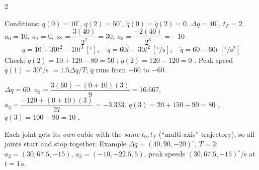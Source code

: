 \begin{multicols}{2}
\nopagebreak[4]
\begin{worked}
Conditions: $q(0)=10^\circ$, $q(2)=50^\circ$, $\dot q(0)=\dot q(2)=0$. $\Delta q=40^\circ$, $t_F=2$.\\
$a_0=10,\ a_1=0,\ a_2=\dfrac{3(40)}{2^2}=30,\ a_3=\dfrac{-2(40)}{2^3}=-10$.
\[q=10+30t^2-10t^3\ [^\circ],\quad \dot q=60t-30t^2\ [^\circ/\text{s}],\quad \ddot q=60-60t\ [^\circ/\text{s}^2]\]
Check: $q(2)=10+120-80=50$ \checkmark; $\dot q(2)=120-120=0$ \checkmark. Peak speed $\dot q(1)=30^\circ$/s $=1.5\Delta q/T$; $\ddot q$ runs from $+60$ to $-60$. \chk
\end{worked}
\begin{worked}[extra: non-zero final speed, $20^\circ\to80^\circ$ in 3\,s, $\dot q_F=10^\circ$/s]
$\Delta q=60$: $a_2=\dfrac{3(60)-(0+10)(3)}{9}=16.667$, $a_3=\dfrac{-120+(0+10)(3)}{27}=-3.333$. $q(3)=20+150-90=80$ \checkmark, $\dot q(3)=100-90=10$ \checkmark. \chk
\end{worked}
\nopagebreak[4]
Each joint gets its \emph{own} cubic with the \emph{same} $t_0,t_F$ (``multi-axis'' trajectory), so all joints start and stop together. Example $\Delta q=(40,90,-20)^\circ$, $T=2$: $a_2=(30,67.5,-15)$, $a_3=(-10,-22.5,5)$, peak speeds $(30,67.5,-15)^\circ$/s at $t=1$\,s. \chk



\end{multicols}
